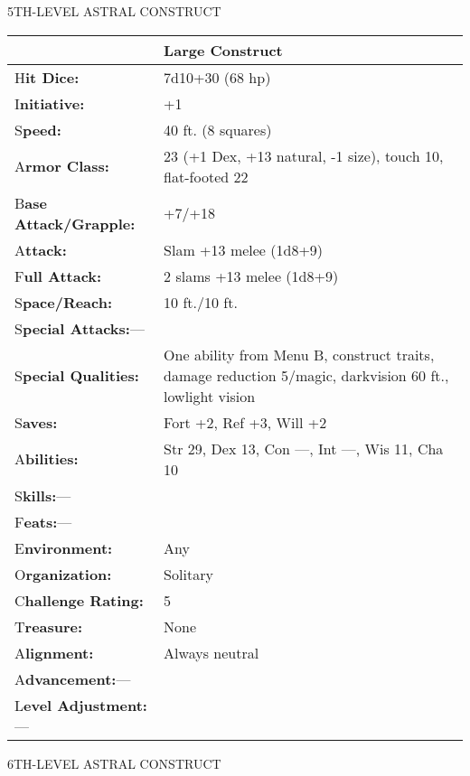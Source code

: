 \documentclass{article}
\begin{document}
\vspace{12pt}
{\LARGE{}5TH-LEVEL ASTRAL CONSTRUCT}

\begin{tabular}{|>{\raggedright}p{80pt}|>{\raggedright}p{246pt}|}
\hline
  & Large Construct\tabularnewline
\hline
H\textbf{it Dice:} & 7d10+30 (68 hp)\tabularnewline
\hline
I\textbf{nitiative:} & +1\tabularnewline
\hline
S\textbf{peed:} & 40 ft. (8 squares)\tabularnewline
\hline
A\textbf{rmor Class:} & 23 (+1 Dex, +13 natural, -1 size), touch 10, flat-footed 
22\tabularnewline
\hline
B\textbf{ase Attack/Grapple:} & +7/+18\tabularnewline
\hline
A\textbf{ttack:} & Slam +13 melee (1d8+9)\tabularnewline
\hline
F\textbf{ull Attack:} & 2 slams +13 melee (1d8+9)\tabularnewline
\hline
S\textbf{pace/Reach:} & 10 ft./10 ft.\tabularnewline
\hline
S\textbf{pecial Attacks:}--- & \tabularnewline
\hline
S\textbf{pecial Qualities:} & One ability from Menu B, construct traits, damage 
reduction 5/magic, darkvision 60 ft., lowlight vision\tabularnewline
\hline
S\textbf{aves:} & Fort +2, Ref +3, Will +2\tabularnewline
\hline
A\textbf{bilities:} & Str 29, Dex 13, Con ---, Int ---, Wis 11, Cha 10\tabularnewline
\hline
S\textbf{kills:}--- & \tabularnewline
\hline
F\textbf{eats:}--- & \tabularnewline
\hline
E\textbf{nvironment:} & Any\tabularnewline
\hline
O\textbf{rganization:} & Solitary\tabularnewline
\hline
C\textbf{hallenge Rating:} & 5\tabularnewline
\hline
T\textbf{reasure:} & None\tabularnewline
\hline
A\textbf{lignment:} & Always neutral\tabularnewline
\hline
A\textbf{dvancement:}--- & \tabularnewline
\hline
L\textbf{evel Adjustment:}--- & \tabularnewline
\hline
\end{tabular}

\vspace{12pt}
{\LARGE{}6TH-LEVEL ASTRAL CONSTRUCT}
\end{document}
